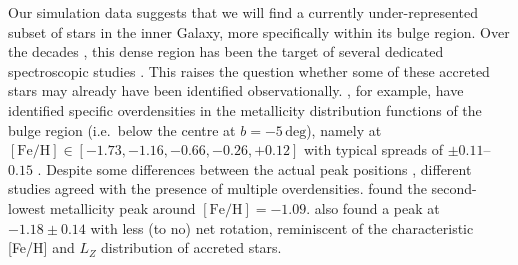 \documentclass[fleqn,usenatbib]{mnras}
\newcommand{\changed}[1]{{{#1}}}
\begin{document}
Our simulation data suggests that we will find a currently under-represented subset of stars in the inner Galaxy, more specifically within its bulge region. Over the decades \citep[see for example][for a review]{Barbuy2018}, this dense region has been the target of several dedicated spectroscopic studies \citep[for example][]{Ness2013, Bensby2017, Lucey2019}. 
This raises the question \changed{whether some of these accreted stars may already have been identified observationally.} \citet{Ness2013, Ness2013b}, for example, have identified specific overdensities in the metallicity distribution functions of the bulge region (i.e.\ below the centre at $b = -5\,\mathrm{deg}$), namely at $\mathrm{[Fe/H]} \in [-1.73, -1.16, -0.66, -0.26, +0.12]$ with typical spreads of $\pm0.11$–$0.15$ \citep[see also][]{Portail2017}.
Despite some differences between the actual peak positions \citep[compare for example Fig.~4 by][]{Barbuy2018}, different studies agreed with the presence of multiple overdensities. \citet{Bensby2017} found the second-lowest metallicity peak around $\mathrm{[Fe/H]} = -1.09$. \citet{Portail2017} also found a peak at $-1.18\pm 0.14$ with less (to no) net rotation, reminiscent of the characteristic [Fe/H] and $L_Z$ distribution of accreted stars. 
\end{document}
